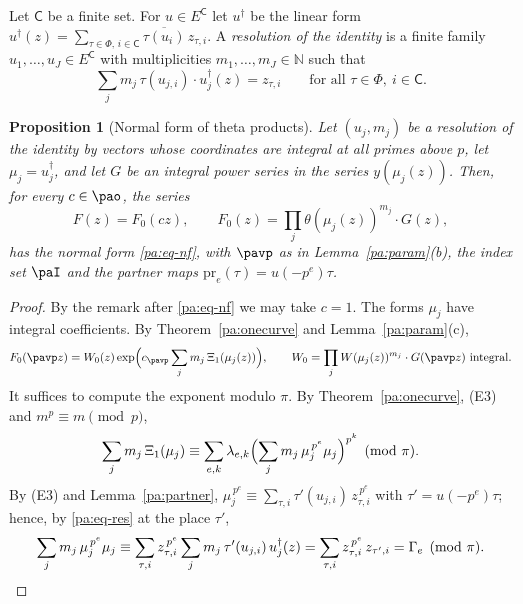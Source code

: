 \documentclass[10pt]{amsart}
\newtheorem{proposition}[theorem]{Proposition}
\theoremstyle{definition}
\theoremstyle{remark}
\newcommand{\N}{\mathbb N}
\providecommand{\auPl}{\Phi}
\providecommand{\aubar}[1]{\overline{#1}}
\begin{document}
Let $\mathsf C$ be a finite set. For $u\in E^{\mathsf C}$ let $u^\dagger$ be the linear form
$u^\dagger(z)=\sum_{\tau\in\auPl,\,i\in\mathsf C}\aubar{\tau(u_i)}\,z_{\tau,i}$. A \emph{resolution
of the identity} is a finite family $u_1,\dots,u_J\in E^{\mathsf C}$ with multiplicities
$m_1,\dots,m_J\in\N$ such that
\begin{equation}\label{pa:eq-res}
\sum_{j}m_j\,\tau(u_{j,i})\cdot u_j^\dagger(z)=z_{\tau,i}\qquad\text{for all }\tau\in\auPl,\
i\in\mathsf C .
\end{equation}

\begin{proposition}[Normal form of theta products]\label{pa:product}
Let $(u_j,m_j)$ be a resolution of the identity by vectors whose coordinates are integral at all
primes above $p$, let $\mu_j=u_j^\dagger$, and let $G$ be an integral power series in the series
$y(\mu_j(z))$. Then, for every $c\in\pao$, the series
\[
F(z)=F_0(cz),\qquad F_0(z)=\prod_j\theta(\mu_j(z))^{m_j}\cdot G(z),
\]
has the normal form \eqref{pa:eq-nf}, with $\pavp$ as in Lemma~\ref{pa:param}(b), the index set
$\paI$ and the partner maps $\mathrm{pr}_e(\tau)=u(-p^e)\tau$.
\end{proposition}
\begin{proof}
By the remark after \eqref{pa:eq-nf} we may take $c=1$. The forms $\mu_j$ have integral
coefficients. By Theorem~\ref{pa:onecurve} and Lemma~\ref{pa:param}(c),
\[
F_0(\pavp z)=W_0(z)\exp\Bigl(c_\pavp\sum_jm_j\,\Xi_1(\mu_j(z))\Bigr),\qquad
W_0=\prod_jW(\mu_j(z))^{m_j}\cdot G(\pavp z)\ \text{integral}.
\]
It suffices to compute the exponent modulo $\pi$. By Theorem~\ref{pa:onecurve}, (E3) and
$m^{p}\equiv m\pmod p$,
\[
\sum_jm_j\,\Xi_1(\mu_j)\equiv\sum_{e,k}\lambda_{e,k}\Bigl(\sum_jm_j\,\mu_j^{\,p^e}\mu_j\Bigr)^{p^k}
\pmod\pi .
\]
By (E3) and Lemma~\ref{pa:partner}, $\mu_j^{\,p^e}\equiv\sum_{\tau,i}\tau'(u_{j,i})\,
z_{\tau,i}^{\,p^e}$ with $\tau'=u(-p^e)\tau$; hence, by \eqref{pa:eq-res} at the place $\tau'$,
\[
\sum_jm_j\,\mu_j^{\,p^e}\mu_j\equiv\sum_{\tau,i}z_{\tau,i}^{\,p^e}\sum_jm_j\,\tau'(u_{j,i})\,
u_j^\dagger(z)=\sum_{\tau,i}z_{\tau,i}^{\,p^e}\,z_{\tau',i}=\Gamma_e\pmod\pi .\qedhere
\]
\end{proof}
\end{document}
